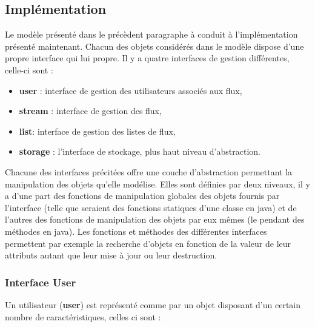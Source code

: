 \subsection{Implémentation}

Le modèle présenté dans le précèdent paragraphe à conduit à l'implémentation
présenté maintenant. Chacun des objets considérés dans le modèle dispose d'une
propre interface qui lui propre. Il y a quatre interfaces de gestion différentes,
celle-ci sont : \\

\begin{itemize}
	\item \textbf{user} : interface de gestion des utilisateurs associés aux flux,
	\item \textbf{stream} : interface de gestion des  flux,
	\item \textbf{list}:  interface de gestion des listes de flux,
	\item \textbf{storage} : l'interface de stockage, plus haut niveau d'abstraction. \\
\end{itemize}


Chacune des interfaces précitées offre une couche d'abstraction permettant la manipulation
des objets qu'elle modélise. Elles sont définies par deux niveaux, il y a d'une part des
fonctions de manipulation globales des objets fournis par l'interface (telle que seraient
des fonctions statiques d'une classe en java) et de l'autres des fonctions de manipulation
des objets par eux mêmes (le pendant des méthodes en java). Les fonctions et méthodes des
différentes interfaces permettent par exemple la recherche d'objets en fonction de la valeur
de leur attributs autant que leur mise à jour ou leur destruction.

\subsubsection{Interface User}

Un utilisateur (\textbf{user}) est représenté comme par un objet disposant
d'un certain nombre de caractéristiques, celles ci sont : \\

